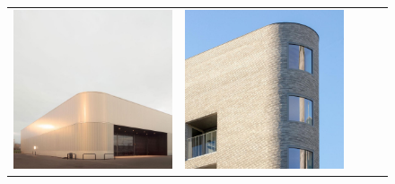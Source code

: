 \begin{figure}[H]
{\begin{tabular}{@{}ccccc@{}}
      \includegraphics[width=\linewidth]{Images/LoRAs/Ghoek/Training_images/11.jpg} &
      \includegraphics[width=\linewidth]{Images/LoRAs/Ghoek/Training_images/12.jpg} &

\end{tabular}}
\end{figure}
